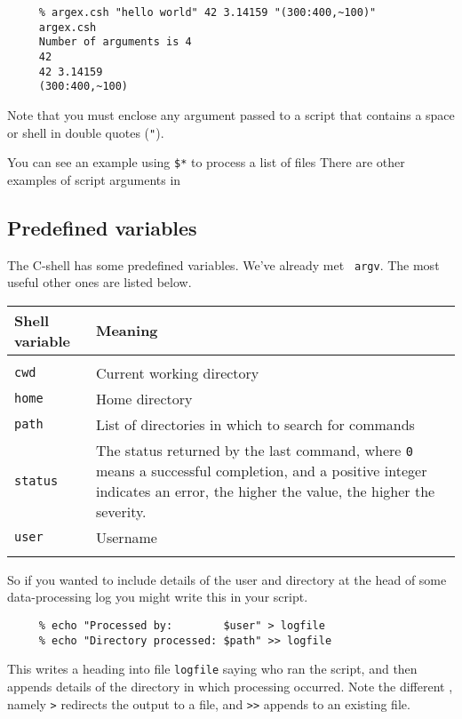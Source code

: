 \small
\begin{verbatim}
     % argex.csh "hello world" 42 3.14159 "(300:400,~100)"
     argex.csh
     Number of arguments is 4
     42
     42 3.14159
     (300:400,~100)
\end{verbatim}
\normalsize
Note that you must enclose any argument passed to a script that contains
a space or shell  in double quotes ({\tt{"}}).

You can see an example using {\tt \$*} to process a list of files 
  There are other examples of script
arguments in 

\subsection{Predefined variables
\label{sc4_se_predefined}}

The C-shell has some predefined variables.  We've already met {\tt
argv}.  The most useful other ones are listed below.

\begin{center}
\begin{tabular}{lp{100mm}}
Shell variable & Meaning \\ \hline
\\
{\tt cwd}      & Current working directory \\
{\tt home}     & Home directory \\
{\tt path}     & List of directories in which to search for commands \\
{\tt status}   & The status returned by the last command, where {\tt 0}
                 means a successful completion, and a positive integer
                 indicates an error, the higher the value, the higher
                 the severity. \\
{\tt user}     & Username \\
\\ \hline
\end{tabular}
\end{center}

So if you wanted to include details of the user and directory at the
head of some data-processing log you might write this in your script.

\small
\begin{verbatim}
     % echo "Processed by:        $user" > logfile
     % echo "Directory processed: $path" >> logfile
\end{verbatim}
\normalsize
This writes a heading into file {\tt logfile} saying who ran the
script, and then appends details of the directory in which processing
occurred. Note the different ,
namely {\tt >} redirects the output to a file, and {\tt >>} appends to
an existing file.


